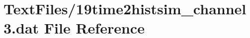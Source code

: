 \hypertarget{19time2histsim__channel3_8dat}{}\section{Text\+Files/19time2histsim\+\_\+channel3.dat File Reference}
\label{19time2histsim__channel3_8dat}
